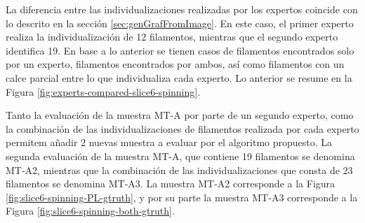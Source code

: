 La diferencia entre las individualizaciones realizadas por los expertos coincide con lo descrito en la secci\'on \ref{sec:genGrafFromImage}. En este caso, el  primer experto realiza la individualizaci\'on de 12 filamentos, mientras que el segundo experto identifica 19. En base a lo anterior se tienen casos de filamentos encontrados solo por un experto, filamentos encontrados por ambos, as\'i como filamentos con un calce parcial entre lo que individualiza cada experto. Lo anterior se resume en la Figura \ref{fig:experts-compared-slice6-spinning}.

%

Tanto la evaluaci\'on de la muestra MT-A por parte de un segundo experto, como la combinaci\'on de las individualizaciones de filamentos realizada por cada experto permitem a\~nadir 2 nuevas muestra a evaluar por el algoritmo propuesto. La segunda evaluaci\'on de la muestra MT-A, que contiene 19 filamentos se denomina MT-A2, mientras que la combinaci\'on de las individualizaciones que consta de 23 filamentos se denomina MT-A3. La muestra MT-A2 corresponde a la Figura \ref{fig:slice6-spinning-PL-gtruth}, y por su parte la muestra MT-A3 corresponde a la Figura \ref{fig:slice6-spinning-both-gtruth}.

